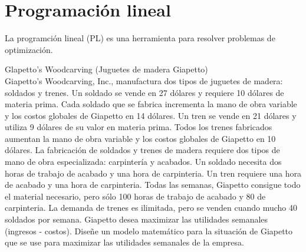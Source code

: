 \documentclass[../main.tex]{subfiles}
\begin{document}
\section{Programación lineal} 
    La programción lineal (PL) es una herramienta para resolver problemas de optimización.

    \begin{example} Glapetto's Woodcarving (Juguetes de madera Giapetto)\\
        Giapetto's Woodcarving, Inc., manufactura dos tipos de juguetes de madera: soldados y trenes. Un soldado se vende en 27 dólares y requiere 10 dólares de materia prima. Cada soldado que se fabrica incrementa la mano de obra variable y los costos globales de Giapetto en 14 dólares. Un tren se vende en 21 dólares y utiliza 9 dólares de su valor en materia prima. Todos los trenes fabricados aumentan la mano de obra variable y los costos globales de Giapetto en 10 dólares. La fabricación de soldados y trenes de madera requiere dos tipos de mano de obra especializada: carpintería y acabados. Un soldado necesita dos horas de trabajo de acabado y una hora de carpinteria. Un tren requiere una hora de acabado y una hora de carpinteria. Todas las semanas, Giapetto consigue todo el material necesario, pero sólo 100 horas de trabajo de acabado y 80 de carpinteria. La demanda de trenes es ilimitada, pero se venden cuando mucho 40 soldados por semana. Giapetto desea maximizar las utilidades semanales (ingresos - costos). Diseñe un modelo matemático para la situación de Giapetto que se use para maximizar las utilidades semanales de la empresa.\\


\end{example}
\end{document}
